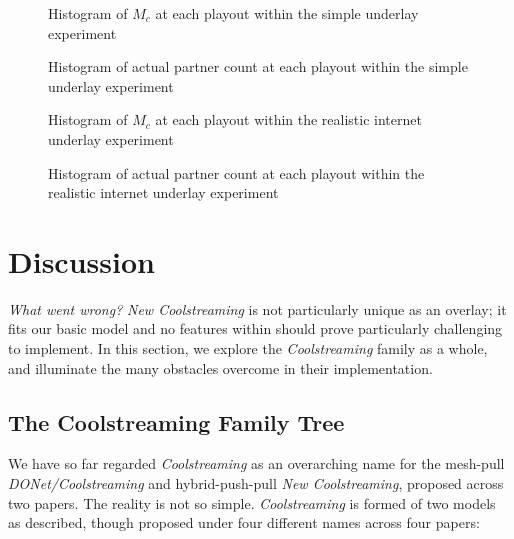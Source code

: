 \documentclass[12pt,a4paper]{article}
\begin{document}
\begin{figure}[!ht]
	\centering
	\resizebox{0.7\textwidth}{!}{%
		
	}%
	\caption{Histogram of \(M_c\) at each playout within the simple underlay experiment}
	\label{simple_mc_count}
\end{figure}

\begin{figure}[!ht]
	\centering
	\resizebox{0.7\textwidth}{!}{%
		
	}%
	\caption{Histogram of actual partner count at each playout within the simple underlay experiment}
	\label{simple_partner_count}
\end{figure}

\begin{figure}[!ht]
	\centering
	\resizebox{0.7\textwidth}{!}{%
		
	}%
	\caption{Histogram of \(M_c\) at each playout within the realistic internet underlay experiment}
	\label{inet_mc_count}
\end{figure}

\begin{figure}[!ht]
	\centering
	\resizebox{0.7\textwidth}{!}{%
		
	}%
	\caption{Histogram of actual partner count at each playout within the realistic internet underlay experiment}
	\label{inet_partner_count}
\end{figure}

\clearpage
\section{Discussion} \label{problems}
\textit{What went wrong?} \textit{New Coolstreaming} is not particularly unique as an overlay; it fits our basic model and no features within should prove particularly challenging to implement. In this section, we explore the \textit{Coolstreaming} family as a whole, and illuminate the many obstacles overcome in their implementation.

\subsection{The Coolstreaming Family Tree} \label{problems:familytree}
We have so far regarded \textit{Coolstreaming} as an overarching name for the mesh-pull \textit{DONet/Coolstreaming} and hybrid-push-pull \textit{New Coolstreaming}, proposed across two papers. The reality is not so simple. \textit{Coolstreaming} is formed of two models as described, though proposed under four different names across four papers:
\end{document}
